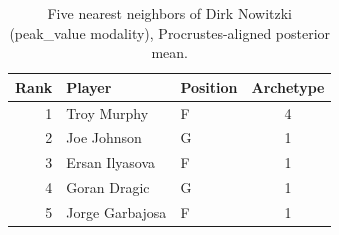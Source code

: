 \begin{table}[htbp]
  \centering\small
  \begin{tabular}{rllc}
    \toprule
    Rank & Player & Position & Archetype \\
    \midrule
    1 & Troy Murphy & F & 4 \\
    2 & Joe Johnson & G & 1 \\
    3 & Ersan Ilyasova & F & 1 \\
    4 & Goran Dragic & G & 1 \\
    5 & Jorge Garbajosa & F & 1 \\
    \bottomrule
  \end{tabular}
  \caption{Five nearest neighbors of Dirk Nowitzki (peak_value modality), Procrustes-aligned posterior mean.}
  \label{tab:Dirk_Nowitzki_neighbors_peak_value}
\end{table}

